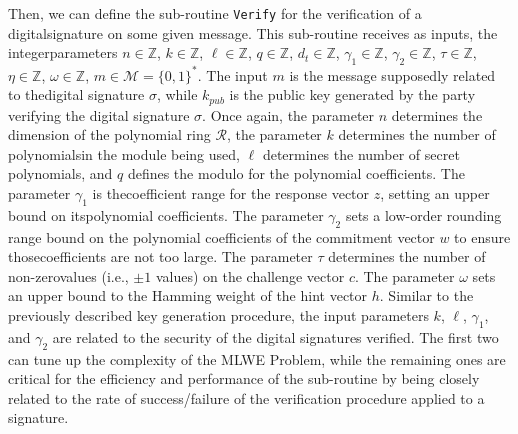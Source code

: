 \documentclass[runningheads]{llncs}
\numberwithin{equation}{section}
\begin{document}
    \vfill
    
    \clearpage
    
    Then, we can define the sub-routine \texttt{Verify} for the verification of a digital\break signature on some given message. This sub-routine receives as inputs, the integer\break parameters $n \in \mathbb{Z}$, $k \in \mathbb{Z}$, $\ell \in \mathbb{Z}$, $q \in \mathbb{Z}$, ${d}_{t} \in \mathbb{Z}$, ${\gamma}_{1} \in \mathbb{Z}$, ${\gamma}_{2} \in \mathbb{Z}$, $\tau \in \mathbb{Z}$, $\eta \in \mathbb{Z}$, $\omega \in \mathbb{Z}$, $m \in \mathcal{M} = { \{0, 1\} }^{*}$. The input $m$ is the message supposedly related to the\break digital signature $\sigma$, while ${k}_{pub}$ is the public key generated by the party verifying the digital signature $\sigma$. Once again, the parameter $n$ determines the dimension of the polynomial ring $\mathcal{R}$, the parameter $k$ determines the number of polynomials\break in the module being used, $\ell$ determines the number of secret polynomials, and $q$ defines the modulo for the polynomial coefficients. The parameter ${\gamma}_{1}$ is the\break coefficient range for the response vector $z$, setting an upper bound on its\break polynomial coefficients. The parameter ${\gamma}_{2}$ sets a low-order rounding range bound on the polynomial coefficients of the commitment vector $w$ to ensure those\break coefficients are not too large. The parameter $\tau$ determines the number of non-zero\break values (i.e., $\pm 1$ values) on the challenge vector $c$. The parameter $\omega$ sets an upper bound to the Hamming weight of the hint vector $h$. Similar to the previously described key generation procedure, the input parameters $k$, $\ell$, ${\gamma}_{1}$, and ${\gamma}_{2}$ are related to the security of the digital signatures verified. The first two can tune up the complexity of the MLWE Problem, while the remaining ones are critical for the efficiency and performance of the sub-routine by being closely related to the rate of success/failure of the verification procedure applied to a signature.
    
    \vspace{2ex}
\end{document}
